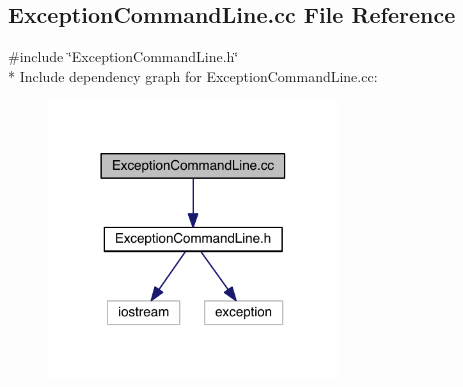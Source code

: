 \hypertarget{a00103}{}\subsection{Exception\+Command\+Line.\+cc File Reference}
\label{a00103}
{\ttfamily \#include \char`\"{}Exception\+Command\+Line.\+h\char`\"{}}\\*
Include dependency graph for Exception\+Command\+Line.\+cc\+:\nopagebreak
\begin{figure}[H]
\begin{center}
\leavevmode
\includegraphics[width=218pt]{a00137}
\end{center}
\end{figure}
